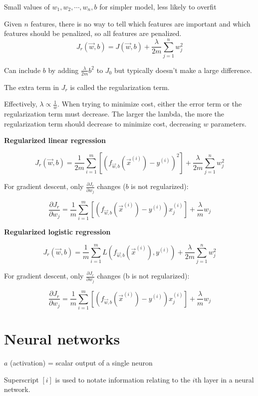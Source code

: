 \documentclass[12pt]{article}
\begin{document}
Small values of $w_1,w_2,\cdots,w_n,b$ for simpler model, less likely to overfit

Given $n$ features, there is no way to tell which features are important and which features should be penalized, so all features are penalized.
\[ J_r(\vec{w},b) = J(\vec{w},b) + \frac{\lambda}{2m} \sum_{j=1}^n w_j^2 \]

Can include $b$ by adding $\frac{\lambda}{2m} b^2$ to $J_0$ but typically doesn't make a large difference.

The extra term in $J_r$ is called the regularization term.

Effectively, $\lambda \propto \frac{1}{w}$. When trying to minimize cost, either the error term or the regularization term must decrease. The larger the lambda, the more the regularization term should decrease to minimize cost, decreasing $w$ parameters.

\noindent \textbf{Regularized linear regression}

\[ J_r(\vec{w},b) = \frac{1}{2m} \sum_{i=1}^m \left[(f_{\vec{w},b}(\vec{x}^{(i)}) - y^{(i)})^2\right] + \frac{\lambda}{2m} \sum_{j=1}^n w_j^2 \]

For gradient descent, only $\frac{\partial J_r}{\partial w_j}$ changes ($b$ is not regularized):

\[ \frac{\partial J_r}{\partial w_j} = \frac{1}{m} \sum_{i=1}^m \left[(f_{\vec{w},b}(\vec{x}^{(i)}) - y^{(i)})x_j^{(i)}\right] + \frac{\lambda}{m} w_j \]

\noindent \textbf{Regularized logistic regression}

\[ J_r(\vec{w},b) = \frac{1}{m} \sum_{i=1}^m L(f_{\vec{w},b}(\vec{x}^{(i)}), y^{(i)}) + \frac{\lambda}{2m} \sum_{j=1}^n w_j^2 \]

For gradient descent, only $\frac{\partial J_r}{\partial w_j}$ changes (b is not regularized):

\[ \frac{\partial J_r}{\partial w_j} = \frac{1}{m} \sum_{i=1}^m \left[(f_{\vec{w},b}(\vec{x}^{(i)}) - y^{(i)})x_j^{(i)}\right] + \frac{\lambda}{m} w_j \]

\pagebreak

\section{Neural networks}

$a$ (activation) = scalar output of a single neuron

Superscript $[i]$ is used to notate information relating to the $i$th layer in a neural network.
\end{document}
